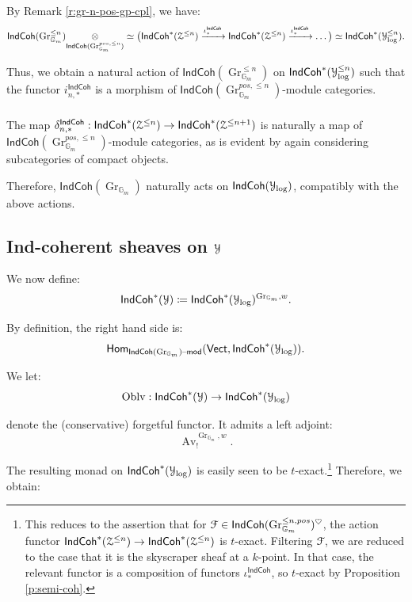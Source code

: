 \documentclass[reqno,11pt]{amsart}
\numberwithin{equation}{subsection}
\theoremstyle{remark}
\newcommand{\xar}[1]{\xrightarrow{#1}}
\newcommand{\bG}{{\mathbb G}}
\newcommand{\sF}{{\EuScript F}}
\newcommand{\sY}{{\EuScript Y}}
\newcommand{\sZ}{{\EuScript Z}}
\newcommand{\on}{\operatorname}
\newcommand{\mathendash}{\text{\textendash}}
\newcommand{\Vect}{\mathsf{Vect}}
\newcommand{\Gr}{\on{Gr}}
\renewcommand{\mod}{\mathendash\mathsf{mod}}
\newcommand{\TwoHom}{\mathsf{Hom}}
\newcommand{\heart}{\heartsuit}
\newcommand{\Oblv}{\on{Oblv}}
\newcommand{\Av}{\on{Av}}
\newcommand{\IndCoh}{\mathsf{IndCoh}}
\begin{document}
\subsubsection{}

By Remark \ref{r:gr-n-pos-gp-cpl}, we have:
%
\[
\IndCoh(\Gr_{\bG_m}^{\leq n}) \underset{\IndCoh(\Gr_{\bG_m}^{pos,\leq n})}{\otimes} 
\simeq \big(
\IndCoh^*(\sZ^{\leq n}) \xar{\iota_*^{\IndCoh}}
\IndCoh^*(\sZ^{\leq n}) \xar{\iota_*^{\IndCoh}} \ldots \big) \simeq 
\IndCoh^*(\sY_{\log}^{\leq n}).
\]

\noindent Thus, we obtain a natural action of $\IndCoh(\Gr_{\bG_m}^{\leq n})$
on $\IndCoh^*(\sY_{\log}^{\leq n})$ such that the functor
$i_{n,*}^{\IndCoh}$ is a morphism of $\IndCoh(\Gr_{\bG_m}^{pos,\leq n})$-module
categories. 

\subsubsection{}

The map $\delta_{n,*}^{\IndCoh}:\IndCoh^*(\sZ^{\leq n}) \to \IndCoh^*(\sZ^{\leq n+1})$
is naturally a map of $\IndCoh(\Gr_{\bG_m}^{pos,\leq n})$-module categories,
as is evident by again considering subcategories of compact objects. 

Therefore, $\IndCoh(\Gr_{\bG_m})$ naturally acts on $\IndCoh(\sY_{\log})$,
compatibly with the above actions. 

\subsection{Ind-coherent sheaves on $\sY$}

We now define:
%
\[
\IndCoh^*(\sY) \coloneqq \IndCoh^*(\sY_{\log})^{\Gr_{\bG_m},w}.
\]

\noindent By definition, the right hand side is:
%
\[
\TwoHom_{\IndCoh(\Gr_{\bG_m})\mod}(\Vect, \IndCoh^*(\sY_{\log})).
\]

We let:
%
\[
\Oblv:\IndCoh^*(\sY) \to \IndCoh^*(\sY_{\log})
\]

\noindent denote the (conservative) forgetful functor.
It admits a left adjoint:
%
\[
\Av_!^{\Gr_{\bG_m},w}.
\] 

The resulting monad on $\IndCoh^*(\sY_{\log})$ is easily seen to be 
$t$-exact.\footnote{This reduces to the assertion that for 
$\sF \in \IndCoh(\Gr_{\bG_m}^{\leq n,pos})^{\heart}$, the 
action functor $\IndCoh^*(\sZ^{\leq n}) \to \IndCoh^*(\sZ^{\leq n})$
is $t$-exact. Filtering $\sF$, we are reduced to the case that
it is the skyscraper sheaf at a $k$-point. In that case, the
relevant functor is a composition of functors $\iota_*^{\IndCoh}$,
so $t$-exact by Proposition \ref{p:semi-coh}.}
Therefore, we obtain:
\end{document}
